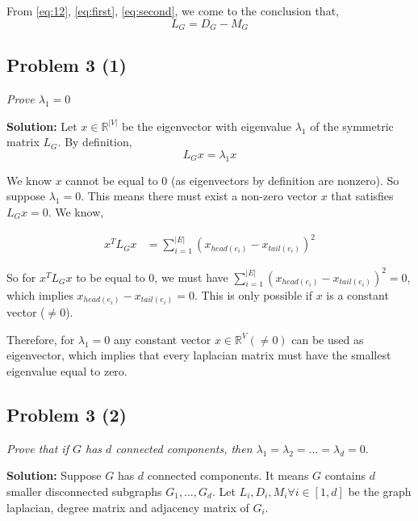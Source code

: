 \documentclass[12pt,a4paper]{article}
\begin{document}
From \eqref{eq:12}, \eqref{eq:first}, \eqref{eq:second}, we come to the conclusion that,
\begin{equation}
    L_G = D_G - M_G
\end{equation}

\newpage
\subsection*{Problem 3 (1)}
\textit{
    Prove $\lambda_1=0$
}

\noindent\textbf{Solution:}
Let $x \in \mathbb{R}^{|V|}$ be the eigenvector with eigenvalue $\lambda_1$ of the symmetric matrix $L_G$. By definition,
\begin{equation}
    L_Gx = \lambda_1x
\end{equation}

We know $x$ cannot be equal to 0 (as eigenvectors by definition are nonzero). So suppose $\lambda_1 = 0$. This means there must exist a non-zero vector $x$ that satisfies $L_Gx = 0$. We know,

\begin{align}
    x^TL_Gx &= \sum\limits_{i=1}^{|E|}(x_{head(e_i)} - x_{tail(e_i)})^2
\end{align}

So for $x^TL_Gx$ to be equal to 0, we must have $\sum\limits_{i=1}^{|E|}(x_{head(e_i)} - x_{tail(e_i)})^2 = 0$, which implies $x_{head(e_i)} - x_{tail(e_i)} = 0$. This is only possible if $x$ is a constant vector ($\neq 0$).

Therefore, for $\lambda_1=0$ any constant vector $x \in \mathbb{R}^V (\neq 0)$ can be used as eigenvector, which implies that every laplacian matrix must have the smallest eigenvalue equal to zero.

\newpage
\subsection*{Problem 3 (2)}
\textit{
    Prove that if $G$ has $d$ connected components, then $\lambda_1 = \lambda_2 = \hdots = \lambda_d = 0.$
}

\noindent\textbf{Solution:}
Suppose $G$ has $d$ connected components. It means $G$ contains $d$ smaller disconnected subgraphs $G_1, \hdots, G_d$. Let $L_i, D_i, M_i \forall i \in [1,d]$ be the graph laplacian, degree matrix and adjacency matrix of $G_i$.
\end{document}
